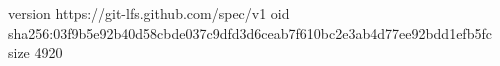 version https://git-lfs.github.com/spec/v1
oid sha256:03f9b5e92b40d58cbde037c9dfd3d6ceab7f610bc2e3ab4d77ee92bdd1efb5fc
size 4920
